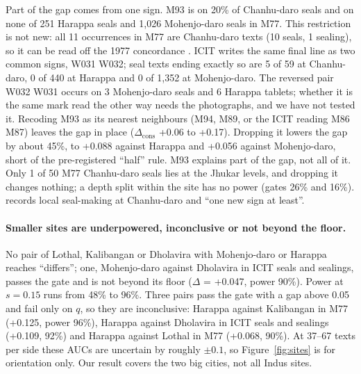 \documentclass[11pt,a4paper]{article}
\newcommand{\sign}[1]{\textsf{#1}}
\begin{document}
Part of the gap comes from one sign.
\sign{M93} is on 20\% of Chanhu-daro seals and on none of 251 Harappa seals and 1,026 Mohenjo-daro seals in M77. %
This restriction is not new: all 11 occurrences in M77 are Chanhu-daro texts (10 seals, 1 sealing), so it can be read off the 1977 concordance \citep{mahadevan1977}. %
ICIT writes the same final line as two common signs, \sign{W031} \sign{W032}; seal texts ending exactly so are 5 of 59 at Chanhu-daro, 0 of 440 at Harappa and 0 of 1,352 at Mohenjo-daro. %
The reversed pair \sign{W032} \sign{W031} occurs on 3 Mohenjo-daro seals and 6 Harappa tablets; whether it is the same mark read the other way needs the photographs, and we have not tested it. %
Recoding \sign{M93} as its nearest neighbours (\sign{M94}, \sign{M89}, or the ICIT reading \sign{M86} \sign{M87}) leaves the gap in place ($\Delta_{\mathrm{cons}}$ +0.06 to +0.17). %
Dropping it lowers the gap by about 45\%, to +0.088 against Harappa and +0.056 against Mohenjo-daro, short of the pre-registered ``half'' rule. %
\sign{M93} explains part of the gap, not all of it.
Only 1 of 50 M77 Chanhu-daro seals lies at the Jhukar levels, and dropping it changes nothing; a depth split within the site has no power (gates 26\% and 16\%). %
\citet[pp.~145--149]{mackay1943} records local seal-making at Chanhu-daro and ``one new sign at least''.

\paragraph{Smaller sites are underpowered, inconclusive or not beyond the floor.} No pair of Lothal, Kalibangan or Dholavira with Mohenjo-daro or Harappa reaches ``differs''; one, Mohenjo-daro against Dholavira in ICIT seals and sealings, passes the gate and is not beyond its floor ($\Delta$ = +0.047, power 90\%). %
Power at $s = 0.15$ runs from 48\% to 96\%. %
Three pairs pass the gate with a gap above 0.05 and fail only on $q$, so they are inconclusive: Harappa against Kalibangan in M77 (+0.125, power 96\%), Harappa against Dholavira in ICIT seals and sealings (+0.109, 92\%) and Harappa against Lothal in M77 (+0.068, 90\%). %
At 37--67 texts per side these AUCs are uncertain by roughly $\pm 0.1$, so Figure~\ref{fig:sites} is for orientation only. %
Our result covers the two big cities, not all Indus sites.
\end{document}
